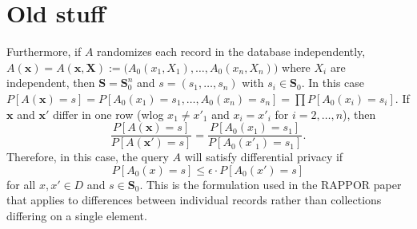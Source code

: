 \documentclass[11pt,draft]{article}
\begin{document}
\section{Old stuff}




Furthermore, if $A$ randomizes each record in the database independently,
\ie $A(\boldsymbol{x}) = A(\boldsymbol{x}, \boldsymbol{X}) := 
\big(A_0(x_1, X_1),\dots,A_0(x_n,X_n)\big)$
where $X_i$ are independent,
then $\boldsymbol{S} = \boldsymbol{S}_0^n$ and $s = (s_1,\dots,s_n)$ with 
$s_i \in \boldsymbol{S}_0$. 
In this case
$P[A(\boldsymbol{x}) = s] = P[A_0(x_1) = s_1,\dots,A_0(x_n) = s_n]
= \prod P[A_0(x_i) = s_i]$.
If $\boldsymbol{x}$ and $\boldsymbol{x'}$ differ in one row (wlog $x_1 \neq x'_1$ and $x_i = x'_i$ for $i = 2,\dots,n$),
then
\[ \frac{P[A(\boldsymbol{x}) = s]}{P[A(\boldsymbol{x'}) = s]} = 
\frac{P[A_0(x_1) = s_1]}{P[A_0(x'_1) = s_1]}. \]
Therefore, in this case, the query $A$ will satisfy differential privacy if
\[ P[A_0(x) = s] \leq \epsilon \cdot P[A_0(x') = s] \]
for all $x,x' \in D$ and $s \in \boldsymbol{S}_0$.
This is the formulation used in the RAPPOR paper that applies to differences between individual records rather than collections differing on a single element.
\end{document}
